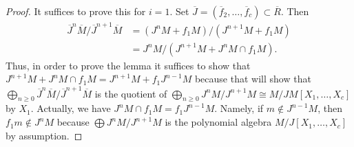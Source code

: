 \documentclass[10pt,a4paper]{amsart}
\theoremstyle{plain}
\theoremstyle{definition}
\theoremstyle{remark}
\numberwithin{equation}{subsection}
\begin{document}
\begin{proof}
It suffices to prove this for $i = 1$. Set
$\overline{J} = (\overline{f}_2, \ldots, \overline{f}_c) \subset \overline{R}$.
Then
\begin{align*}
\overline{J}^n\overline{M}/\overline{J}^{n + 1}\overline{M}
& =
(J^nM + f_1M)/(J^{n + 1}M + f_1M) \\
& = J^nM / (J^{n + 1}M + J^nM \cap f_1M).
\end{align*}
Thus, in order to prove the lemma it suffices to show that
$J^{n + 1}M + J^nM \cap f_1M = J^{n + 1}M + f_1J^{n - 1}M$
because that will show that
$\bigoplus_{n \geq 0}
\overline{J}^n\overline{M}/\overline{J}^{n + 1}\overline{M}$
is the quotient of
$\bigoplus_{n \geq 0} J^nM/J^{n + 1}M \cong M/JM[X_1, \ldots, X_c]$
by $X_1$. Actually, we have $J^nM \cap f_1M = f_1J^{n - 1}M$.
Namely, if $m \not \in J^{n - 1}M$, then $f_1m \not \in J^nM$
because $\bigoplus J^nM/J^{n + 1}M$ is the polynomial algebra
$M/J[X_1, \ldots, X_c]$ by assumption.
\end{proof}
\end{document}
